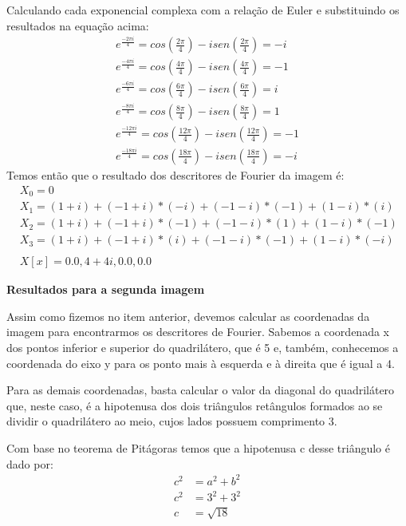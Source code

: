 \documentclass[12pt]{article}
\begin{document}
\begin{itemize}
\begin{itemize}
Calculando cada exponencial complexa com a relação de Euler e substituindo os resultados na equação acima:
\begin{align*}
    &e^{\frac{-2\pi i}{4}} = cos(\frac{2\pi}{4}) - isen(\frac{2\pi}{4}) = -i &\\
    &e^{\frac{-4\pi i}{4}} = cos(\frac{4\pi}{4}) - isen(\frac{4\pi}{4}) = -1 &\\
    &e^{\frac{-6\pi i}{4}} = cos(\frac{6\pi}{4}) - isen(\frac{6\pi}{4}) = i &\\
    &e^{\frac{-8\pi i}{4}} = cos(\frac{8\pi}{4}) - isen(\frac{8\pi}{4}) = 1 &\\
    &e^{\frac{-12\pi i}{4}} = cos(\frac{12\pi}{4}) - isen(\frac{12\pi}{4}) = -1 &\\
    &e^{\frac{-18\pi i}{4}} = cos(\frac{18\pi}{4}) - isen(\frac{18\pi}{4}) = -i &
\end{align*}
Temos então que o resultado dos descritores de Fourier da imagem é:
\begin{align*}
    &X_0 = 0 &\\
    &X_1 = (1 + i) + (-1 + i)*(-i) + (-1 - i)*(-1) + (1 - i)*(i) &\\
    &X_2 = (1 + i) + (-1 + i)*(-1) + (-1 - i)*(1) + (1 - i)*(-1) &\\
    &X_3 = (1 + i) + (-1 + i)*(i) + (-1 - i)*(-1) + (1 - i)*(-i) &\\
    \\
    &X[x] = 0.0, 4 + 4i, 0.0, 0.0 &
\end{align*}

\textbf{Resultados para a segunda imagem}

Assim como fizemos no item anterior, devemos calcular as coordenadas da imagem para encontrarmos os descritores de Fourier.
Sabemos a coordenada x dos pontos inferior e superior do quadrilátero, que é 5 e, também, conhecemos a coordenada do eixo y para os ponto mais à esquerda e à direita que é igual a 4.

Para as demais coordenadas, basta calcular o valor da diagonal do quadrilátero que, neste caso, é a hipotenusa dos dois triângulos retângulos formados ao se dividir o quadrilátero ao meio, cujos lados possuem comprimento 3. 
    
Com base no teorema de Pitágoras temos que a hipotenusa c desse triângulo é dado por:
\begin{align*}
 c^2 &= a^2 + b^2 \\
 c^2 &= 3^2 + 3^2 \\
 c &= \sqrt{18}	     
\end{align*}


\end{itemize}
\end{itemize}
\end{document}
